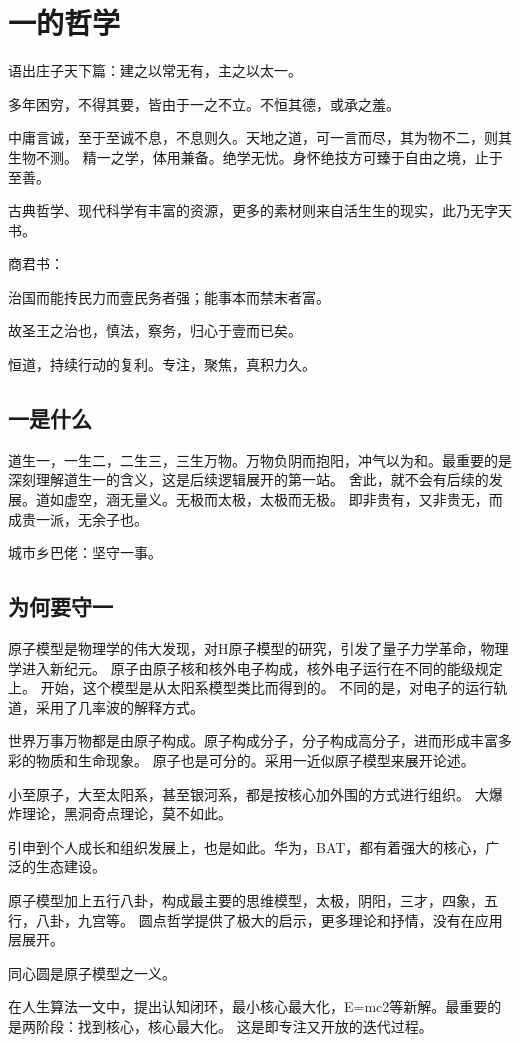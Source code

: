 \chapter{一的哲学}

语出庄子天下篇：建之以常无有，主之以太一。

多年困穷，不得其要，皆由于一之不立。不恒其德，或承之羞。

中庸言诚，至于至诚不息，不息则久。天地之道，可一言而尽，其为物不二，则其生物不测。
精一之学，体用兼备。绝学无忧。身怀绝技方可臻于自由之境，止于至善。

古典哲学、现代科学有丰富的资源，更多的素材则来自活生生的现实，此乃无字天书。

商君书：
\begin{shadequote}

治国而能抟民力而壹民务者强；能事本而禁末者富。

故圣王之治也，慎法，察务，归心于壹而已矣。
\end{shadequote}

恒道，持续行动的复利。专注，聚焦，真积力久。

\section{一是什么}

道生一，一生二，二生三，三生万物。万物负阴而抱阳，冲气以为和。最重要的是深刻理解道生一的含义，这是后续逻辑展开的第一站。
舍此，就不会有后续的发展。道如虚空，涵无量义。无极而太极，太极而无极。
即非贵有，又非贵无，而成贵一派，无余子也。

城市乡巴佬：坚守一事。

\section{为何要守一}

原子模型是物理学的伟大发现，对H原子模型的研究，引发了量子力学革命，物理学进入新纪元。
原子由原子核和核外电子构成，核外电子运行在不同的能级规定上。
开始，这个模型是从太阳系模型类比而得到的。
不同的是，对电子的运行轨道，采用了几率波的解释方式。

世界万事万物都是由原子构成。原子构成分子，分子构成高分子，进而形成丰富多彩的物质和生命现象。
原子也是可分的。采用一近似原子模型来展开论述。

小至原子，大至太阳系，甚至银河系，都是按核心加外围的方式进行组织。
大爆炸理论，黑洞奇点理论，莫不如此。

引申到个人成长和组织发展上，也是如此。华为，BAT，都有着强大的核心，广泛的生态建设。

原子模型加上五行八卦，构成最主要的思维模型，太极，阴阳，三才，四象，五行，八卦，九宫等。
圆点哲学提供了极大的启示，更多理论和抒情，没有在应用层展开。

同心圆是原子模型之一义。

在人生算法一文中，提出认知闭环，最小核心最大化，E=mc2等新解。最重要的是两阶段：找到核心，核心最大化。
这是即专注又开放的迭代过程。
